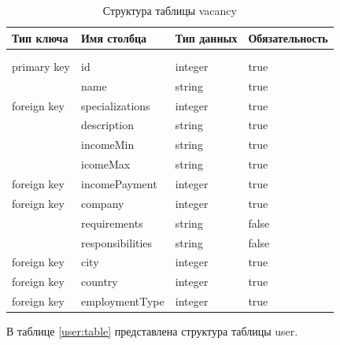 \begin{xltabular}{\textwidth}{|l|l|p{1.7cm}|X|}
	\caption{Структура таблицы vacancy \label{vacancy:table}}\\ \hline
	\centrow Тип ключа & \centrow Имя столбца & \centrow Тип
	данных & \centrow Обязательность \\ \hline
	 &  &  &  \\ \hline
	\endfirsthead
	 &  &  &  \\ \hline
	\finishhead
	primary key & id & integer & true \\ \hline 
	 & name & string & true \\ \hline 
	foreign key & specializations & integer & true \\ \hline 
	& description & string & true \\ \hline 
	& incomeMin & string & true \\ \hline 
	& icomeMax & string & true \\ \hline 
   foreign key & incomePayment & integer & true \\ \hline
	foreign key & company & integer & true \\ \hline
	& requirements & string & false \\ \hline
	& responsibilities & string & false \\ \hline
	foreign key & city & integer & true \\ \hline
	foreign key & country & integer & true \\ \hline
	foreign key & employmentType & integer & true \\ \hline
\end{xltabular}

В таблице \ref{user:table} представлена структура таблицы user.

